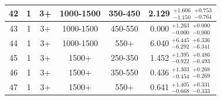 \begin{table}[htbp]
\begin{centering}
\begin{tabular}{|c|c|c|c|c||c|}
\hline
42 &               1 &              3+ &       1000-1500 &         350-450 & 2.129 $^{+1.606}_{-1.150}$ $^{+0.753}_{-0.764}$ \\ 
\hline
43 &               1 &              3+ &       1000-1500 &         450-550 & 0.000 $^{+1.263}_{-0.000}$ $^{+0.000}_{-0.000}$ \\ 
\hline
44 &               1 &              3+ &       1000-1500 &            550+ & 6.040 $^{+6.445}_{-6.292}$ $^{+6.336}_{-6.341}$ \\ 
\hline
45 &               1 &              3+ &           1500+ &         250-350 & 1.452 $^{+1.395}_{-0.922}$ $^{+0.486}_{-0.493}$ \\ 
\hline
46 &               1 &              3+ &           1500+ &         350-550 & 0.436 $^{+1.303}_{-0.454}$ $^{+0.268}_{-0.269}$ \\ 
\hline
47 &               1 &              3+ &           1500+ &            550+ & 0.641 $^{+1.405}_{-0.668}$ $^{+0.331}_{-0.333}$ \\ 
\hline
\end{tabular}
\par\end{centering}
\end{table}

